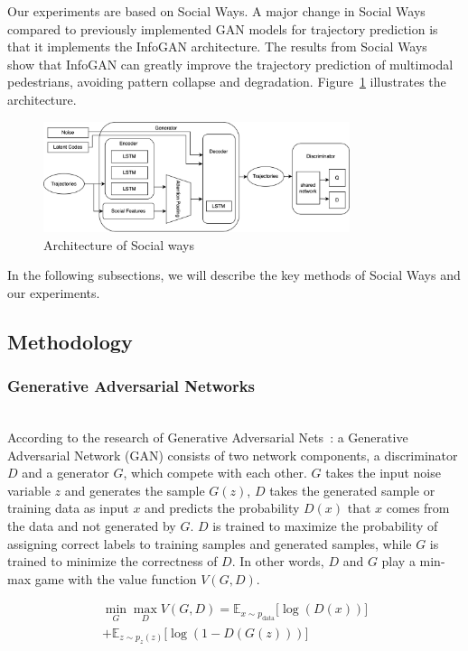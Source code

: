 Our experiments are based on Social Ways. A major change in Social Ways compared to previously implemented GAN models for trajectory prediction is that it implements the InfoGAN architecture. The results from Social Ways~\cite{DBLP:journals/corr/abs-1904-09507} show that InfoGAN can greatly improve the trajectory prediction of multimodal pedestrians, avoiding pattern collapse and degradation. Figure~\ref{socialways} illustrates the architecture.

\begin{figure}[ht]
  \centering
  \includegraphics[width=0.8\textwidth]{figures/socialways.png}
  \caption{Architecture of Social ways}
  \label{socialways}
\end{figure}

In the following subsections, we will describe the key methods of Social Ways and our experiments.

\subsection{Methodology}


\subsubsection{Generative Adversarial Networks}
\hfill \\
According to the research of Generative Adversarial Nets~\cite{gan}: a Generative Adversarial Network (GAN) consists of two network components, a discriminator $D$ and a generator $G$, which compete with each other. $G$ takes the input noise variable $z$ and generates the sample $G(z)$, $D$ takes the generated sample or training data as input $x$ and predicts the probability $D(x)$ that $x$ comes from the data and not generated by $G$. $D$ is trained to maximize the probability of assigning correct labels to training samples and generated samples, while $G$ is trained to minimize the correctness of $D$. In other words, $D$ and $G$ play a min-max game with the value function $V(G, D)$.

\begin{multline}
  \min_{G} \max_{D} V(G, D) = \mathbb{E}_{x \sim p_{\text{data}}} \lbrack \log(D(x))\rbrack \\ + \mathbb{E}_{z \sim p_{z}(z)} \lbrack \log(1 - D(G(z))) \rbrack
\end{multline}

